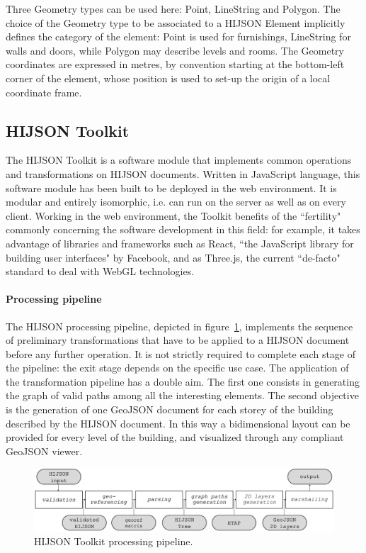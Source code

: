 \documentclass{sig-alternate}
\begin{document}
Three Geometry types can be used here: Point, LineString and Polygon. The
choice of the Geometry type to be associated to a HIJSON Element implicitly
defines the category of the element: Point is used for furnishings, LineString
for walls and doors, while Polygon may describe levels and rooms. The Geometry
coordinates are expressed in metres, by convention starting at the bottom-left
corner of the element, whose position is used to set-up the origin of a local
coordinate frame.

\subsection{HIJSON Toolkit}

The HIJSON Toolkit is a software module that implements common operations and
transformations on HIJSON documents. Written in JavaScript language, this
software module has been built to be deployed in the web environment. It is
modular and entirely isomorphic, i.e. can run on the server as well as on
every client. Working in the web environment, the Toolkit benefits of the
``fertility" commonly concerning the software development in this field: for
example, it takes advantage of libraries and frameworks such as React, ``the
JavaScript library for building user interfaces" by Facebook, and as Three.js,
the current ``de-facto" standard to deal with WebGL technologies.

\paragraph{Processing pipeline}  The HIJSON processing pipeline, depicted in
figure~\ref{fig:pipeline}, implements the sequence of preliminary
transformations that have to be applied to a HIJSON document before any
further operation. It is not strictly required to complete each stage of the
pipeline: the exit stage depends on the specific use case.
The application of the transformation pipeline has a double aim. The first one
consists in generating the graph of valid paths among all the interesting
elements. The second objective is the generation of one GeoJSON document for
each storey of the building described by the HIJSON document. In this way a
bidimensional layout can be provided for every level of the building, and
visualized through any compliant GeoJSON viewer.

\begin{figure}[h]
 \centering
 \includegraphics[width=\linewidth]{images/pipeline}
 \caption{HIJSON Toolkit processing pipeline.}
 \label{fig:pipeline}
\end{figure}
\end{document}
